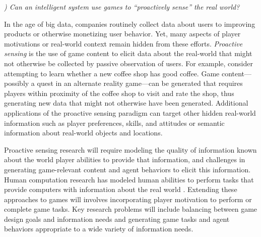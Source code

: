 \documentclass[conference]{IEEEtran}
\newcounter{questionno}
\newcommand{\mytodo}[1]{\textbf{[[#1]]}}
\newcommand{\subsubsectionx}[1]{{\em {\arabic{questionno}) #1}}
	\addtocounter{questionno}{1}
	}
\begin{document}


\subsubsectionx{Can an intelligent system use games to ``proactively sense'' the real world?}
%
In the age of big data, companies routinely collect data about users to improving products or otherwise monetizing user behavior.
Yet, many aspects of player motivations or real-world context remain hidden from these efforts.
{\em Proactive sensing} is the use of game content to elicit data about the real-world that might not otherwise be collected by passive observation of users.
%
For example, consider attempting to learn whether a new coffee shop has good coffee.
Game content---possibly a quest in an alternate reality game---can be generated that requires players within proximity of the coffee shop to visit and rate the shop, thus generating new data that might not otherwise have been generated.
Additional applications of the proactive sensing paradigm can target other hidden real-world information such as player preferences, skills, and attitudes or semantic information about real-world objects and locations.

Proactive sensing research will require modeling the quality of information known about the world player abilities to provide that information, and challenges in generating game-relevant content and agent behaviors to elicit this information. 
Human computation research has modeled human abilities to perform tasks that provide computers with information about the real world \cite{law2011:hcomp-book}. 
Extending these approaches to games will involves incorporating player motivation to perform or complete game tasks.
Key research problems will include balancing between game design goals and information needs and generating game tasks and agent behaviors appropriate to a wide variety of information needs.
\end{document}
